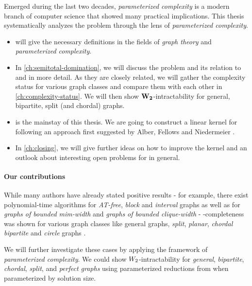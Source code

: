Emerged during the last two decades, \textit{parameterized complexity} is a modern branch of computer science that showed many practical implications. 
This thesis systematically analyzes the \sdom problem through the lens of \textit{parameterized complexity}. 

\begin{itemize}
    \item {} will give the necessary definitions in the fields of \textit{graph theory} and \textit{parameterized complexity}.
    \item In \cref{ch:semitotal-domination}, we will discuss the \sdom problem and its relation to \dom and \tdom in more detail. 
    As they are closely related, we will gather the complexity status for various graph classes and compare them with each other in \cref{ch:complexity-status}. 
    We will then show $\mathbf{W_2}$-intractability for general, bipartite, split (and chordal) graphs.
    \item {} is the mainstay of this thesis. 
    We are going to construct a linear kernel for \psdom following an approach first suggested by Alber, Fellows and Niedermeier \cite{Alber2004}. 
    \item In \cref{ch:closing}, we will give further ideas on how to improve the kernel and an outlook about interesting open problems for \sdom in general.
\end{itemize}


\paragraph{Our contributions}

While many authors have already stated positive results - for example, there exist polynomial-time algorithms for \emph{AT-free}, \emph{block} and \emph{interval} graphs as well as for \emph{graphs of bounded mim-width} and \emph{graphs of bounded clique-width} \cite{Kloks2021, Galby2020,Courcelle1990,Henning2022,Henning2019} - \NP-completeness was shown for various graph classes like general graphs, \emph{split}, \emph{planar}, \emph{chordal bipartite} and \emph{circle} graphs \cite{Henning2019, Kloks2021}.


We will further investigate these \NPc cases by applying the framework of \textit{parameterized complexity}. 
We could show $W_2$-intractability for \textit{general}, \textit{bipartite}, \textit{chordal}, \textit{split}, and \textit{perfect graphs} using parameterized reductions from \dom when parameterized by solution size.

